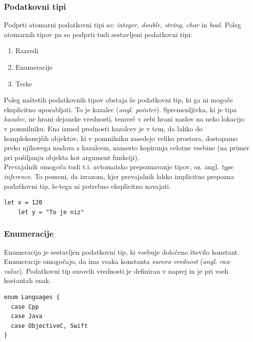 \documentclass[a4paper, 12pt]{book}
\begin{document}
\subsubsection{Podatkovni tipi}

Podprti atomarni podatkovni tipi so: \textit{integer, double, string, char} in \textit{bool}. Poleg atomarnih tipov pa so podprti tudi sestavljeni podatkovni tipi:

\begin{enumerate}
	\item Razredi
	\item Enumeracije
	\item Terke
\end{enumerate}

Poleg naštetih podatkovnih tipov obstaja še podatkovni tip, ki ga ni mogoče eksplicitno uporabljati. To je kazalec (\textit{angl. pointer}). Spremenljivka, ki je tipa \textit{kazalec}, ne hrani dejanske vrednosti, temveč v sebi hrani naslov na neko lokacijo v pomnilniku. Ena izmed prednosti kazalcev je v tem, da lahko do kompleksnejših objektov, ki v pomnilniku zasedejo veliko prostora, dostopamo preko njihovega naslova s kazalcem, namesto kopiranja celotne vsebine (na primer pri pošiljanju objekta kot argument funkciji). \\
\indent Prevajalnik omogoča tudi t.i. avtomatsko prepoznavanje tipov, oz. angl. \textit{type inference}. To pomeni, da izrazom, kjer prevajalnik lahko implicitno prepozna podatkovni tip, le-tega ni potrebno eksplicitno navajati.

\begin{lstlisting}[caption={Primer deklaracij spremenljivk, kjer je njun tip prepoznan avtomastsko}, captionpos=b]
	let x = 120
	let y = "To je niz"
\end{lstlisting}

\subsubsection{Enumeracije}

Enumeracija je sestavljen podatkovni tip, ki vsebuje določeno število konstant. Enumeracije omogočajo, da ima vsaka konstanta \textit{surovo vrednost} (\textit{angl. raw value}). Podatkovni tip surovih vrednosti je definiran v naprej in je pri vseh kostantah enak.

\begin{lstlisting}[caption=Enumeracija brez surovih vrednosti, captionpos=b, label={lst:languagesEnumeration}]
enum Languages {
  case Cpp
  case Java
  case ObjectiveC, Swift
}
\end{lstlisting}
\end{document}
